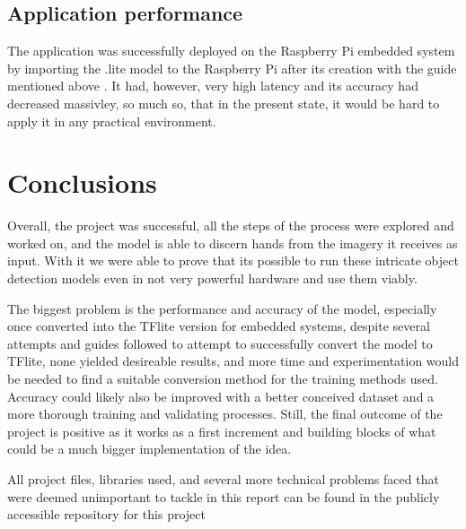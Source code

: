 \documentclass[10pt]{article}
\begin{document}
	\subsection{Application performance}

		The application was successfully deployed on the Raspberry Pi embedded system by importing the .lite model to the Raspberry Pi after its creation with the guide mentioned above \cite{8}. It had, however, very high latency and its accuracy had decreased massivley, so much so, that in the present state, it would be hard to apply it in any practical environment.

		\pagebreak

\section{Conclusions}\label{sec:5}

	Overall, the project was successful, all the steps of the process were explored and worked on, and the model is able to discern hands from the imagery it receives as input. With it we were able to prove that its possible to run these intricate object detection models even in not very powerful hardware and use them viably.

	The biggest problem is the performance and accuracy of the model, especially once converted into the TFlite version for embedded systems, despite several attempts and guides followed to attempt to successfully convert the model to TFlite\cite{11}\cite{12}, none yielded desireable results, and more time and experimentation would be needed to find a suitable conversion method for the training methods used. Accuracy could likely also be improved with a better conceived dataset and a more thorough training and validating processes. Still, the final outcome of the project is positive as it works as a first increment and building blocks of what could be a much bigger implementation of the idea.

	All project files, libraries used, and several more technical problems faced that were deemed unimportant to tackle in this report can be found in the publicly accessible repository for this project \cite{10}

\newpage
\end{document}
